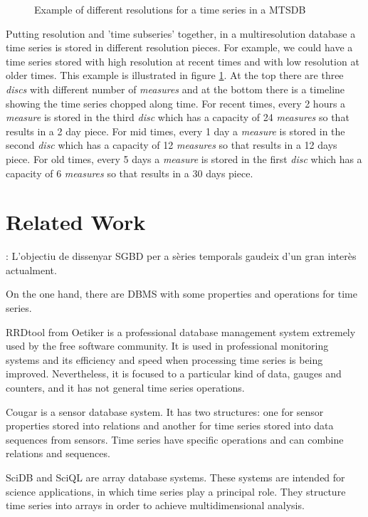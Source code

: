 \documentclass{scrartcl}
\newcommand{\imatges}{../../imatges}
\begin{document}
\begin{figure}[tp]
\centering

\caption{Example of different resolutions for a time series in a MTSDB}
\label{fig:model:window}
\end{figure}


Putting resolution and 'time subseries' together, in a multiresolution database a time series is stored in different resolution pieces. For example, we could have a time series stored with high resolution at recent times and with low resolution at older times. This example is illustrated in figure \ref{fig:model:window}. At the top there are three \emph{discs} with different number of \emph{measures} and at the bottom there is a timeline showing the time series chopped along time. For recent times, every 2 hours a \emph{measure} is stored in the third \emph{disc} which has a capacity of 24 \emph{measures} so that results in a 2 day piece. For mid times, every 1 day a  \emph{measure} is stored in the second \emph{disc} which has a capacity of 12 \emph{measures} so that results in a 12 days piece. For old times, every 5 days a  \emph{measure} is stored in the first \emph{disc} which has a capacity of 6 \emph{measures} so that results in a 30 days piece. 


\section{Related Work}


: L'objectiu de dissenyar SGBD per a sèries temporals gaudeix d'un gran interès actualment.

On the one hand, there are DBMS with some properties and operations
for time series.

RRDtool from Oetiker \cite{rrdtool} is a professional database
management system extremely used by the free software community. It is
used in professional monitoring systems and its efficiency and speed
when processing time series is being improved. Nevertheless, it is
focused to a particular kind of data, gauges and counters, and it has
not general time series operations.

Cougar \cite{bonnet01} is a sensor database system. It has two
structures: one for sensor properties stored into relations and
another for time series stored into data sequences from sensors.  Time
series have specific operations and can combine relations and
sequences.


SciDB \cite{stonebraker09:scidb} and SciQL \cite{zhang11} are array
database systems. These systems are intended for science applications,
in which time series play a principal role. They structure time series
into arrays in order to achieve multidimensional analysis.
\end{document}
